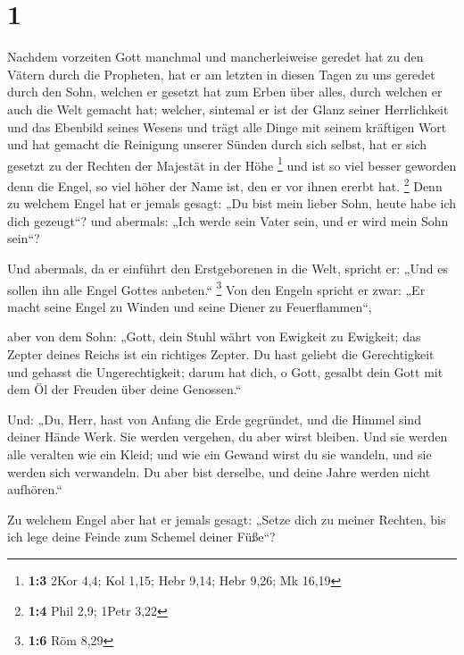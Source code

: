 \hypertarget{section}{%
\section{1}\label{section}}

 Nachdem vorzeiten Gott manchmal und mancherleiweise
geredet hat zu den Vätern durch die Propheten,  hat er am
letzten in diesen Tagen zu uns geredet durch den Sohn, welchen er
gesetzt hat zum Erben über alles, durch welchen er auch die Welt gemacht
hat;  welcher, sintemal er ist der Glanz seiner
Herrlichkeit und das Ebenbild seines Wesens und trägt alle Dinge mit
seinem kräftigen Wort und hat gemacht die Reinigung unserer Sünden durch
sich selbst, hat er sich gesetzt zu der Rechten der Majestät in der Höhe
\footnote{\textbf{1:3} 2Kor 4,4; Kol 1,15; Hebr 9,14; Hebr 9,26; Mk
  16,19}  und ist so viel besser geworden denn die Engel,
so viel höher der Name ist, den er vor ihnen ererbt hat. \footnote{\textbf{1:4}
  Phil 2,9; 1Petr 3,22}  Denn zu welchem Engel hat er
jemals gesagt: „Du bist mein lieber Sohn, heute habe ich dich gezeugt``?
und abermals: „Ich werde sein Vater sein, und er wird mein Sohn sein``?

 Und abermals, da er einführt den Erstgeborenen in die
Welt, spricht er: „Und es sollen ihn alle Engel Gottes anbeten.``
\footnote{\textbf{1:6} Röm 8,29}  Von den Engeln spricht
er zwar: „Er macht seine Engel zu Winden und seine Diener zu
Feuerflammen``,

 aber von dem Sohn: „Gott, dein Stuhl währt von Ewigkeit
zu Ewigkeit; das Zepter deines Reichs ist ein richtiges Zepter.
 Du hast geliebt die Gerechtigkeit und gehasst die
Ungerechtigkeit; darum hat dich, o Gott, gesalbt dein Gott mit dem Öl
der Freuden über deine Genossen.``

 Und: „Du, Herr, hast von Anfang die Erde gegründet, und
die Himmel sind deiner Hände Werk.  Sie werden vergehen,
du aber wirst bleiben. Und sie werden alle veralten wie ein Kleid;
 und wie ein Gewand wirst du sie wandeln, und sie werden
sich verwandeln. Du aber bist derselbe, und deine Jahre werden nicht
aufhören.``

 Zu welchem Engel aber hat er jemals gesagt: „Setze dich
zu meiner Rechten, bis ich lege deine Feinde zum Schemel deiner Füße``?

